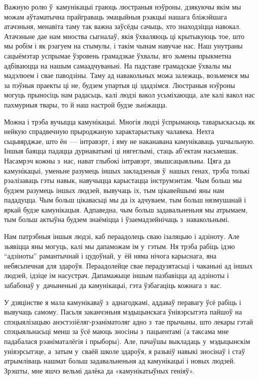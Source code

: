 Важную ролю ў~камунікацыі граюць люстраныя нэўроны, дзякуючы якім мы можам аўтаматычна прайграваць эмацыйныя рэакцыі нашага бліжэйшага атачэньня, менавіта таму так важна заўсёды сачыць, хто знаходзіцца навокал. Атачэньне дае нам мноства сыгналаў, якія ўхваляюць ці крытыкуюць тое, што мы робім і як рэагуем на стымулы, і такім чынам навучае нас. Наш унутраны сацыёмэтар успрымае ўзровень грамадзкае ўхвалы, яго зьмены прыкметна адбіваюцца на нашым самаадчуваньні. На падставе грамадскае ўхвалы мы мадэлюем і свае паводзіны. Таму ад навакольных можа залежаць, возьмемся мы за пэўныя праекты ці не, будзем упартыя ці здадзімся. Люстраныя нэўроны могуць прыносіць нам радасьць, калі людзі вакол усьміхаюцца, але калі вакол нас пахмурныя твары, то й наш настрой будзе зьніжацца.

Можна і трэба вучыцца камунікацыі. Многія людзі ўспрымаюць таварыскасьць як нейкую спрадвечную прыроджаную характарыстыку чалавека. Нехта сьцьвярджае, што ён~--- інтравэрт, і яму не наканавана камунікаваць ушчыльную. Іншыя баяцца падацца дурнаватымі ці нягеглымі, стаць аб'ектам насьмешак. Насамрэч кожны з~нас, нават глыбокі інтравэрт, звышсацыяльны. Цяга да камунікацыі, уменьне разумець іншых закладзеныя ў~нашых генах, трэба толькі рэалізаваць гэты навык, навучыцца карыстацца інструмэнтам. Чым больш мы будзем разумець іншых людзей, вывучаць іх, тым цікавейшымі яны нам пададуцца. Чым больш цікавасьці мы да іх адчуваем, тым больш нязмушанай і яркай будзе камунікацыя. Адпаведна, чым больш задавальненьня мы атрымаем, тым больш актыўна будзем знаёміцца і ўзаемадзейнічаць з~навакольнымі.

Нам патрэбныя іншыя людзі, каб пераадолець сваю ізаляцыю і адзіноту. Але зьявіцца яны могуць, калі мы дапаможам ім у~гэтым. Ня трэба рабіць ідэю ``адзіноты'' рамантычнай і цудоўнай, у~ёй няма нічога карыснага, яна небясьпечная для здароўя. Пераадолейце свае перадузятасьці і чаканьні ад іншых людзей, ідзіце ім насустрач. Дапамажыце іншым пазбавіцца ад адзіноты і забабонаў у~дачыненьні да камунікацыі, гэта ўзбагаціць кожнага з~вас.

У дзяцінстве я мала камунікаваў з~аднагодкамі, аддаваў перавагу ўсё рабіць і вывучаць самому. Пасьля заканчэньня мэдыцынскага ўнівэрсытэта пайшоў на спэцыялізацыю анэстэзіёляг-рэаніматоляг адно з~тае прычыны, што лекары гэтай спэцыяльнасьці менш за ўсё маюць зносіны з~пацыентамі (а таксама мне падабалася рэаніматалёгія і прыборы). Але, пачаўшы выкладаць у~мэдыцынскім унівэрсытэце, а~затым у~сваёй школе здароўя, я разьвіў навыкі зносінаў і стаў атрымліваць нашмат больш задавальненьня ад камунікацыі і новых людзей. Зрэшты, мне яшчэ вельмі далёка да «камунікатыўных геніяў».

